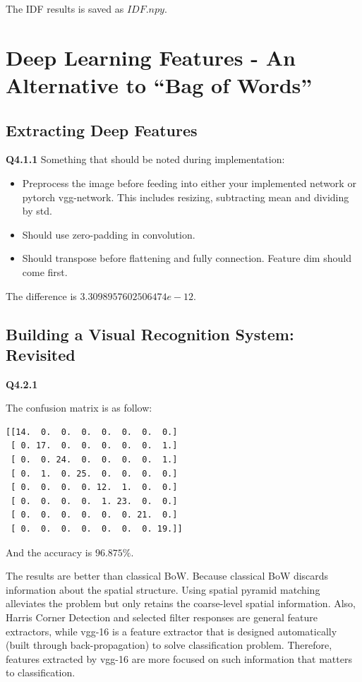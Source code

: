 \documentclass[
  course = {{16-720B Computer Vision}},
  quartile = {{1}},
  assignment = 2-Bag\ of \ Visual\ Words,
  name = {{Kangle Deng}},
  email = {{kangled@andrew.cmu.edu}},
  firstexercise = 1
]{aga-homework}
\begin{document}
The IDF results is saved as $IDF.npy$.

\section{Deep Learning Features - An Alternative to ``Bag of Words''}
\subsection{Extracting Deep Features}
\noindent \textbf{Q4.1.1}
Something that should be noted during implementation:
\begin{itemize}
    \item Preprocess the image before feeding into either your implemented network or pytorch vgg-network. This includes resizing, subtracting mean and dividing by std.
    \item Should use zero-padding in convolution.
    \item Should transpose before flattening and fully connection. Feature dim should come first.
\end{itemize}

The difference is $3.3098957602506474e-12$.

\subsection{Building a Visual Recognition System: Revisited}
\noindent \textbf{Q4.2.1}

The confusion matrix is as follow:

\begin{verbatim}
[[14.  0.  0.  0.  0.  0.  0.  0.]
 [ 0. 17.  0.  0.  0.  0.  0.  1.]
 [ 0.  0. 24.  0.  0.  0.  0.  1.]
 [ 0.  1.  0. 25.  0.  0.  0.  0.]
 [ 0.  0.  0.  0. 12.  1.  0.  0.]
 [ 0.  0.  0.  0.  1. 23.  0.  0.]
 [ 0.  0.  0.  0.  0.  0. 21.  0.]
 [ 0.  0.  0.  0.  0.  0.  0. 19.]]
\end{verbatim}

And the accuracy is $96.875\%$.

The results are better than classical BoW. Because classical BoW discards information about the spatial structure. Using spatial pyramid matching alleviates the problem but only retains the coarse-level spatial information. Also, Harris Corner Detection and selected filter responses are general feature extractors, while vgg-16 is a feature extractor that is designed automatically (built through back-propagation) to solve classification problem. Therefore, features extracted by vgg-16 are more focused on such information that matters to classification.
\end{document}
